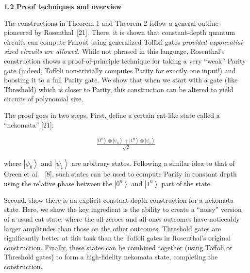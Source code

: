 \par\medskip\noindent\textbf{
1.2 Proof techniques and overview}\par




The constructions in Theorem 1 and Theorem 2 follow a general outline pioneered by Rosenthal [21]. There, it is shown that constant-depth quantum circuits can compute Fanout using generalized Toffoli gates \emph{provided exponential-sized circuits are allowed.} While not phrased in this language, Rosenthal’s construction shows a proof-of-principle technique for taking a very “weak” Parity gate (indeed, Toffoli non-trivially computes Parity for exactly one input!) and boosting it to a full Parity gate. We show that when we start with a gate (like Threshold) which is closer to Parity, this construction can be altered to yield circuits of polynomial size.\par




The proof goes in two steps. First, define a certain cat-like state called a “nekomata” [21]:\par


\[\begin{gathered}
\frac{\left|0^{n}\right\rangle\otimes\left|\psi_{0}\right\rangle+\left|1^{n}\right\rangle\otimes\left|\psi_{1}\right\rangle}{\sqrt{2}}
\end{gathered}\]


where $\left|\psi_{0}\right\rangle$ and $\left|\psi_{1}\right\rangle$ are arbitrary states. Following a similar idea to that of Green et al.  [8], such states can be used to compute Parity in constant depth using the relative phase between the $\left|0^{n}\right\rangle$ and $\left|1^{n}\right\rangle$ part of the state.\par




Second, show there is an explicit constant-depth construction for a nekomata state. Here, we show the key ingredient is the ability to create a “noisy” version of a usual cat state, where the all-zeroes and all-ones outcomes have noticeably larger amplitudes than those on the other outcomes. Threshold gates are significantly better at this task than the Toffoli gates in Rosenthal’s original construction. Finally, these states can be combined together (using Toffoli or Threshold gates) to form a high-fidelity nekomata state, completing the construction.\par





